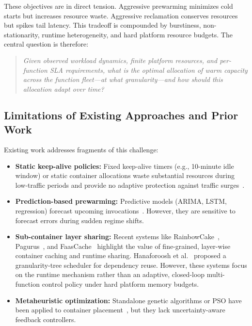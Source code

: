 \documentclass[final,5p,times,twocolumn]{elsarticle}
\begin{document}
These objectives are in direct tension. Aggressive prewarming minimizes cold starts but increases resource waste. Aggressive reclamation conserves resources but spikes tail latency. This tradeoff is compounded by burstiness, non-stationarity, runtime heterogeneity, and hard platform resource budgets. The central question is therefore:

\begin{quote}
\emph{Given observed workload dynamics, finite platform resources, and per-function SLA requirements, what is the optimal allocation of warm capacity across the function fleet---at what granularity---and how should this allocation adapt over time?}
\end{quote}

\subsection{Limitations of Existing Approaches and Prior Work}

Existing work addresses fragments of this challenge:
\begin{itemize}[leftmargin=*]
    \item \textbf{Static keep-alive policies:} Fixed keep-alive timers (e.g., 10-minute idle window) or static container allocations waste substantial resources during low-traffic periods and provide no adaptive protection against traffic surges~\cite{akkus2018sand, oakes2018sock}.
    \item \textbf{Prediction-based prewarming:} Predictive models (ARIMA, LSTM, regression) forecast upcoming invocations~\cite{suresh2021servermore, shahrad2019architectural, daraghmeh2024optimizing, lin2021modeling}. However, they are sensitive to forecast errors during sudden regime shifts.
    \item \textbf{Sub-container layer sharing:} Recent systems like RainbowCake~\cite{rainbowcake2024}, Pagurus~\cite{pagurus2022}, and FaasCache~\cite{faascache2021} highlight the value of fine-grained, layer-wise container caching and runtime sharing. Hanaforoosh et al.~\cite{hanaforoosh2025granularity} proposed a granularity-tree scheduler for dependency reuse. However, these systems focus on the runtime mechanism rather than an adaptive, closed-loop multi-function control policy under hard platform memory budgets.
    \item \textbf{Metaheuristic optimization:} Standalone genetic algorithms or PSO have been applied to container placement~\cite{buyya2023pso, zhan2022survey}, but they lack uncertainty-aware feedback controllers.
\end{itemize}
\end{document}
